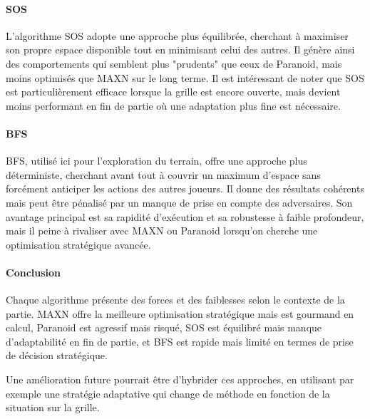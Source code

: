 \paragraph{SOS}
L’algorithme SOS adopte une approche plus équilibrée, cherchant à maximiser son propre espace disponible tout en minimisant celui des autres. Il génère ainsi des comportements qui semblent plus "prudents" que ceux de Paranoid, mais moins optimisés que MAXN sur le long terme. Il est intéressant de noter que SOS est particulièrement efficace lorsque la grille est encore ouverte, mais devient moins performant en fin de partie où une adaptation plus fine est nécessaire.
\newpage
\paragraph{BFS}
BFS, utilisé ici pour l’exploration du terrain, offre une approche plus déterministe, cherchant avant tout à couvrir un maximum d’espace sans forcément anticiper les actions des autres joueurs. Il donne des résultats cohérents mais peut être pénalisé par un manque de prise en compte des adversaires. Son avantage principal est sa rapidité d’exécution et sa robustesse à faible profondeur, mais il peine à rivaliser avec MAXN ou Paranoid lorsqu’on cherche une optimisation stratégique avancée.
\paragraph{Conclusion}
Chaque algorithme présente des forces et des faiblesses selon le contexte de la partie. MAXN offre la meilleure optimisation stratégique mais est gourmand en calcul, Paranoid est agressif mais risqué, SOS est équilibré mais manque d’adaptabilité en fin de partie, et BFS est rapide mais limité en termes de prise de décision stratégique.

Une amélioration future pourrait être d’hybrider ces approches, en utilisant par exemple une stratégie adaptative qui change de méthode en fonction de la situation sur la grille.
